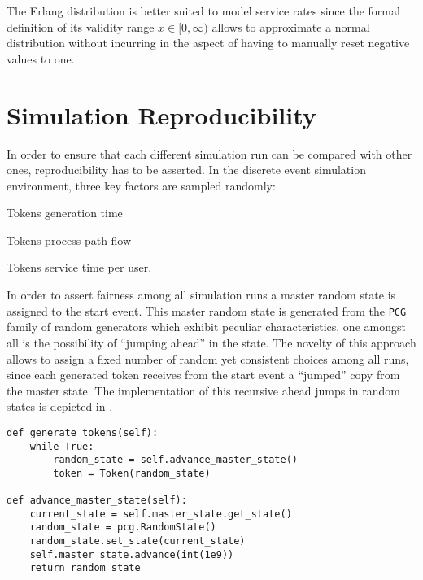 The Erlang distribution is better suited to model service rates since the formal definition of its validity range $x \in [0,\infty)$ allows to approximate a normal distribution without incurring in the aspect of having to manually reset negative values to one.

\section{Simulation Reproducibility}
\label{sec:sim_reproducibility}

In order to ensure that each different simulation run can be compared with other ones, reproducibility has to be asserted. In the discrete event simulation environment, three key factors are sampled randomly:
\begin{enumerate*}
    \item Tokens generation time
    \item Tokens process path flow
    \item Tokens service time per user.
\end{enumerate*}

In order to assert fairness among all simulation runs a master random state is assigned to the start event. This master random state is generated from the \texttt{PCG} family of random generators which exhibit peculiar characteristics, one amongst all is the possibility of ``jumping ahead'' in the state. The novelty of this approach allows to assign a fixed number of random yet consistent choices among all runs, since each generated token receives from the start event a ``jumped'' copy from the master state. The implementation of this recursive ahead jumps in random states is depicted in .

\begin{lstlisting}[caption=Random state advancement method which initially copies the current state of the master random state. It then creates a new random state and sets its state to the former copy then eventually advances the master random state by \num{1e9} units.,label=lst:random_state_jump,style=CustomPython]
def generate_tokens(self):
    while True:
        random_state = self.advance_master_state()
        token = Token(random_state)

def advance_master_state(self):
    current_state = self.master_state.get_state()
    random_state = pcg.RandomState()
    random_state.set_state(current_state)
    self.master_state.advance(int(1e9))
    return random_state
\end{lstlisting}

